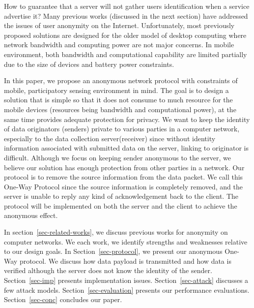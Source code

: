 How to guarantee that a server will not gather users identification when
a service advertise it? Many previous works
\cite{DBLP:conf/uss/DingledineMS04} \cite{DBLP:journals/cacm/ReiterR99}
\cite{DBLP:journals/jcs/LevineS02} \cite{DBLP:conf/percom/HuS10}
(discussed in the next section)
have addressed the issues of user anonymity on the Internet. Unfortunately,
most previously proposed solutions are designed for the older model
of desktop computing where network bandwidth and computing power are not major concerns.
In mobile environment, both bandwidth and computational capability are limited
partially due to the size of devices and battery power constraints.

In this paper, we propose an anonymous network protocol with constraints
of mobile, participatory sensing environment in mind. The goal is to design a
solution that is simple so that it does not consume to much resource for
the mobile devices (resources being bandwidth and computational power),
at the same time provides adequate protection for privacy.
We want to keep the identity of data originators (senders) private to
various parties in a computer network, especially to the data collection
server(receiver) since without identity information associated with submitted
data on the server, linking to originator is difficult. Although we focus
on keeping sender anonymous to the server, we believe our solution has enough
protection from other parties in a network.
Our protocol is to remove the source information from the data
packet. We call this One-Way Protocol since the source information is
completely removed, and the server is unable to reply any kind of
acknowledgement back to the client. The protocol will be implemented on
both the server and the client to achieve the anonymous effect.

In section~\ref{sec-related-works}, we discuss previous works for anonymity
on computer networks.
We each work, we identify strengths and weaknesses relative to our design
goals.
In Section~\ref{sec-protocol}, we present our anonymous One-Way protocol.
We discuss how data payload is transmitted and how data is verified although
the server does not know the identity of the sender.
Section~\ref{sec-imp} presents implementation issues.
Section~\ref{sec-attack} discusses a few attack models.
Section~\ref{sec-evaluation} presents our performance evaluations.
Section~\ref{sec-conc} concludes our paper.

